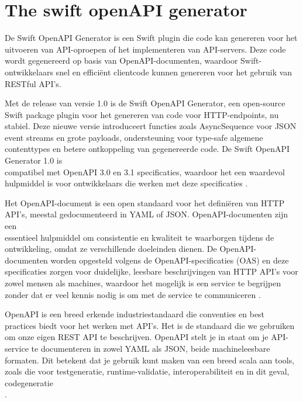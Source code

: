 \section{The swift openAPI generator}
De Swift OpenAPI Generator is een Swift plugin die code kan genereren voor het \\uitvoeren van API-oproepen of het implementeren van API-servers. Deze code wordt gegenereerd op basis van OpenAPI-documenten, waardoor Swift-ontwikkelaars snel en efficiënt clientcode kunnen genereren voor het gebruik van RESTful API's.

Met de release van versie 1.0 is de Swift OpenAPI Generator, een open-source Swift package plugin voor het genereren van code voor HTTP-endpoints, nu stabiel. Deze nieuwe versie introduceert functies zoals AsyncSequence voor JSON event streams en grote payloads, ondersteuning voor type-safe algemene contenttypes en betere ontkoppeling van gegenereerde code. De Swift OpenAPI Generator 1.0 is \\compatibel met OpenAPI 3.0 en 3.1 specificaties, waardoor het een waardevol hulpmiddel is voor ontwikkelaars die werken met deze specificaties \autocite{Simone2024}. 

Het OpenAPI-document is een open standaard voor het definiëren van HTTP API's, meestal gedocumenteerd in YAML of JSON. OpenAPI-documenten zijn een \\essentieel hulpmiddel om consistentie en kwaliteit te waarborgen tijdens de \\ontwikkeling, omdat ze verschillende doeleinden dienen. De OpenAPI-documenten worden opgesteld volgens de OpenAPI-specificaties (OAS) en deze specificaties zorgen voor duidelijke, leesbare beschrijvingen van HTTP API's voor zowel mensen als machines, waardoor het mogelijk is een service te begrijpen zonder dat er veel kennis nodig is om met de service te communiceren \autocite{Miller2020}.

OpenAPI is een breed erkende industriestandaard die conventies en best \\practices biedt voor het werken met API's. Het is de standaard die we gebruiken om onze eigen REST API te beschrijven. OpenAPI stelt je in staat om je API-service te documenteren in zowel YAML als JSON, beide machineleesbare formaten. Dit betekent dat je gebruik kunt maken van een breed scala aan tools, zoals die voor testgeneratie, runtime-validatie, interoperabiliteit en in dit geval, codegeneratie \\\autocite{Simone2024}. 

